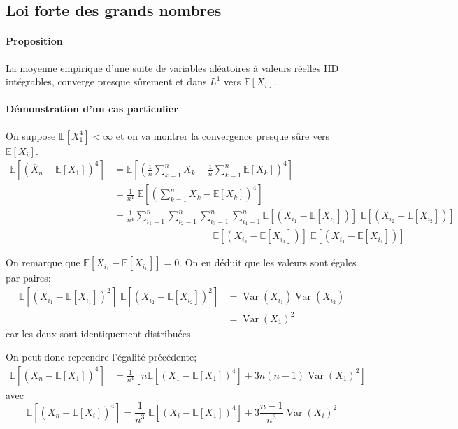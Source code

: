 \documentclass[a4paper,10pt,french,openany]{memoir}
\newcommand{\Esper}{\mathbb{E}}
\DeclareMathOperator{\Var}{Var}
\begin{document}
\subsection{Loi forte des grands nombres}

\paragraph{Proposition}
La moyenne empirique d'une suite de variables aléatoires à valeurs réelles IID intégrables, converge presque sûrement et dans $L^1$ vers $\Esper[X_i]$.

\paragraph{Démonstration d'un cas particulier}
On suppose $\Esper[X_1^4]<\infty$ et on va montrer la convergence presque sûre vers $\Esper[X_i]$.
\begin{align*}
 \Esper\left[(\overline X_n - \Esper[X_1])^4\right] &= \Esper\left[\left(\frac 1 n \sum_{k=1}^n X_k - \frac 1 n \sum_{k=1}^n \Esper[X_k]\right)^4\right] \\
 &= \frac 1 {n^4}\;\Esper\left[\left(\sum_{k=1}^n X_k - \Esper[X_k]\right)^4\right] \\
 &= \frac 1 {n^4} \sum_{i_1 = 1}^n \sum_{i_2 = 1}^n \sum_{i_3 = 1}^n \sum_{i_4 = 1}^n \Esper[(X_{i_1}-\Esper[X_{i_1}])]\; \Esper[(X_{i_2}-\Esper[X_{i_2}])] \\ &\qquad\qquad\qquad\qquad\qquad\, \Esper[(X_{i_3}-\Esper[X_{i_3}])]\; \Esper[(X_{i_4}-\Esper[X_{i_4}])]
\end{align*}

On remarque que $\Esper[X_{i_1} - \Esper[X_{i_1}]] = 0$. On en déduit que les valeurs sont égales par paires:
\begin{align*}
 \Esper\left[(X_{i_1} - \Esper[X_{i_1}])^2\right]\;\Esper\left[(X_{i_2} - \Esper[X_{i_2}])^2\right] &= \Var(X_{i_1}) \Var(X_{i_2}) \\
 &= \Var(X_1)^2
\end{align*}
car les deux sont identiquement distribuées.

On peut donc reprendre l'égalité précédente;
\begin{align*}
 \Esper\left[(\overline X_n - \Esper[X_1])^4\right] &= \frac 1 {n^4} \left[n \Esper\left[(X_1 - \Esper[X_1])^4\right] + 3 n (n-1) \Var(X_1)^2\right]
\end{align*}
avec \[ \Esper\left[(\overline X_n - \Esper[X_i])^4\right] = \frac 1 {n^3}\; \Esper\left[(X_i - \Esper[X_1])^4\right] + 3 \frac{n-1}{n^3} \Var(X_i)^2 \]
\end{document}
